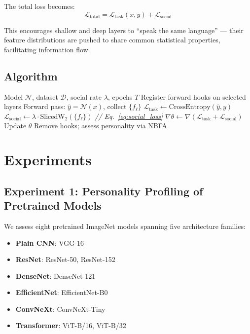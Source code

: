 \documentclass[letterpaper]{article}
\begin{document}
The total loss becomes:
\begin{equation}
    \mathcal{L}_{\text{total}} = \mathcal{L}_{\text{task}}(x, y) + \mathcal{L}_{\text{social}}
\end{equation}

This encourages shallow and deep layers to ``speak the same language'' — their feature distributions are pushed to share common statistical properties, facilitating information flow.

\subsection{Algorithm}

\begin{algorithm}[h]
\caption{Social Dropout Training}
\begin{algorithmic}[1]
\REQUIRE Model $\mathcal{N}$, dataset $\mathcal{D}$, social rate $\lambda$, epochs $T$
\STATE Register forward hooks on selected layers
        \STATE Forward pass: $\hat{y} = \mathcal{N}(x)$, collect $\{f_\ell\}$
        \STATE $\mathcal{L}_{\text{task}} \gets \text{CrossEntropy}(\hat{y}, y)$
        \STATE $\mathcal{L}_{\text{social}} \gets \lambda \cdot \text{SlicedW}_2(\{f_\ell\})$ \hfill \textit{// Eq.~\ref{eq:social_loss}}
        \STATE $\nabla\theta \gets \nabla(\mathcal{L}_{\text{task}} + \mathcal{L}_{\text{social}})$
        \STATE Update $\theta$
    \ENDFOR
\ENDFOR
\STATE Remove hooks; assess personality via NBFA
\end{algorithmic}
\end{algorithm}

\section{Experiments}
\label{sec:experiments}

\subsection{Experiment 1: Personality Profiling of Pretrained Models}

We assess eight pretrained ImageNet models spanning five architecture families:
\begin{itemize}
    \item \textbf{Plain CNN}: VGG-16 \citep{simonyan2014very}
    \item \textbf{ResNet}: ResNet-50, ResNet-152 \citep{he2016deep}
    \item \textbf{DenseNet}: DenseNet-121 \citep{huang2017densely}
    \item \textbf{EfficientNet}: EfficientNet-B0 \citep{tan2019efficientnet}
    \item \textbf{ConvNeXt}: ConvNeXt-Tiny \citep{liu2022convnet}
    \item \textbf{Transformer}: ViT-B/16, ViT-B/32 \citep{dosovitskiy2021image}
\end{itemize}
\end{document}
